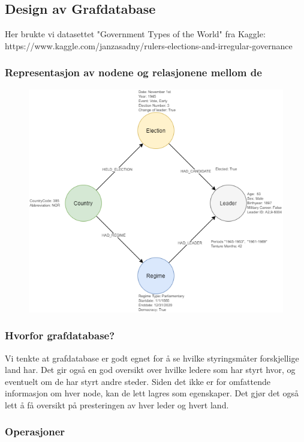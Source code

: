 \subsection{Design av Grafdatabase}
Her brukte vi datasettet "Government Types of the World" fra Kaggle: https://www.kaggle.com/janzasadny/rulers-elections-and-irregular-governance

\subsubsection{Representasjon av nodene og relasjonene mellom de}
\FigureCounter
\begin{figure}[H]
  \includegraphics[scale=1]{images/milepael4/graph_database_base.drawio.png}
\end{figure}

\subsubsection{Hvorfor grafdatabase?}
Vi tenkte at grafdatabase er godt egnet for å se hvilke styringsmåter forskjellige land har. Det gir 
også en god oversikt over hvilke ledere som har styrt hvor, og eventuelt om de har styrt andre 
steder. Siden det ikke er for omfattende informasjon om hver node, kan de lett lagres som 
egenskaper. Det gjør det også lett å få oversikt på presteringen av hver leder og hvert land.

\subsubsection{Operasjoner}

